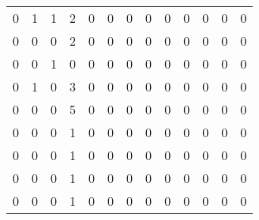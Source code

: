 \begin{tabular}{rrrrrrrrrrrrr}
       0 &       1 &          1 &               2 &                0 &       0 &          0 &          0 &         0 &         0 &      0 &             0 &         0 \\
       0 &       0 &          0 &               2 &                0 &       0 &          0 &          0 &         0 &         0 &      0 &             0 &         0 \\
       0 &       0 &          1 &               0 &                0 &       0 &          0 &          0 &         0 &         0 &      0 &             0 &         0 \\
       0 &       1 &          0 &               3 &                0 &       0 &          0 &          0 &         0 &         0 &      0 &             0 &         0 \\
       0 &       0 &          0 &               5 &                0 &       0 &          0 &          0 &         0 &         0 &      0 &             0 &         0 \\
       0 &       0 &          0 &               1 &                0 &       0 &          0 &          0 &         0 &         0 &      0 &             0 &         0 \\
       0 &       0 &          0 &               1 &                0 &       0 &          0 &          0 &         0 &         0 &      0 &             0 &         0 \\
       0 &       0 &          0 &               1 &                0 &       0 &          0 &          0 &         0 &         0 &      0 &             0 &         0 \\
       0 &       0 &          0 &               1 &                0 &       0 &          0 &          0 &         0 &         0 &      0 &             0 &         0 \\
\bottomrule
\end{tabular}
